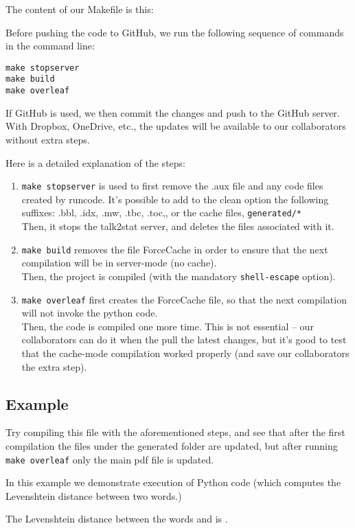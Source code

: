 \documentclass[12pt]{article}
\begin{document}
The content of our Makefile is this:

Before pushing the code to GitHub, we run the following sequence of commands in the command line:
\begin{tcolorbox}
\begin{Verbatim}
make stopserver
make build
make overleaf
\end{Verbatim}
\end{tcolorbox}
If GitHub is used, we then commit the changes and push to the GitHub server. With Dropbox, OneDrive, etc., the updates will be available to our collaborators without extra steps.

Here is a detailed explanation of the steps:
\begin{enumerate}
 \item \verb|make stopserver| is used to first remove the .aux file and any code files created by runcode. It's possible to add to the clean option the following suffixes: .bbl, .idx, .mw, .tbc, .toc,, or the cache files, \verb|generated/*|\\
 Then, it stops the talk2stat server, and deletes the files associated with it.
 \item \verb|make build| removes the file ForceCache in order to ensure that the next compilation will be in server-mode (no cache).\\
 Then, the project is compiled (with the mandatory \verb|shell-escape| option).
 \item \verb|make overleaf| first creates the ForceCache file, so that the next compilation will not invoke the python code.\\
 Then, the code is compiled one more time. This is not essential -- our collaborators can do it when the pull the latest changes, but it's good to test that the cache-mode compilation worked properly (and save our collaborators the extra step).
\end{enumerate}


\subsection*{Example}
Try compiling this file with the aforementioned steps, and see that after the first compilation the files under the generated folder are updated, but after running \verb|make overleaf| only the main pdf file is updated.

In this example we demonstrate execution of Python code (which computes the Levenshtein distance between two words.)


The Levenshtein distance between the words  and  is .
\end{document}

